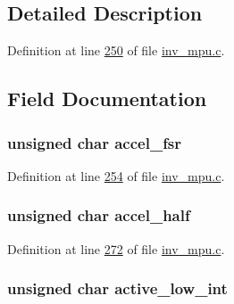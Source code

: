 \subsection{Detailed Description}


Definition at line \hyperlink{inv__mpu_8c_source_l00250}{250} of file \hyperlink{inv__mpu_8c_source}{inv\+\_\+mpu.\+c}.



\subsection{Field Documentation}
\subsubsection[{\texorpdfstring{accel\+\_\+fsr}{accel_fsr}}]{\setlength{\rightskip}{0pt plus 5cm}unsigned char accel\+\_\+fsr}\hypertarget{structchip__cfg__s_a97d5de8aa2fab5cc81ca2180130fc6ac}{}\label{structchip__cfg__s_a97d5de8aa2fab5cc81ca2180130fc6ac}


Definition at line \hyperlink{inv__mpu_8c_source_l00254}{254} of file \hyperlink{inv__mpu_8c_source}{inv\+\_\+mpu.\+c}.

\subsubsection[{\texorpdfstring{accel\+\_\+half}{accel_half}}]{\setlength{\rightskip}{0pt plus 5cm}unsigned char accel\+\_\+half}\hypertarget{structchip__cfg__s_af73df77287fdeba8d408c18f3905650f}{}\label{structchip__cfg__s_af73df77287fdeba8d408c18f3905650f}


Definition at line \hyperlink{inv__mpu_8c_source_l00272}{272} of file \hyperlink{inv__mpu_8c_source}{inv\+\_\+mpu.\+c}.

\subsubsection[{\texorpdfstring{active\+\_\+low\+\_\+int}{active_low_int}}]{\setlength{\rightskip}{0pt plus 5cm}unsigned char active\+\_\+low\+\_\+int}\hypertarget{structchip__cfg__s_ac576d810c0c8bcd73af5908c10a83c3a}{}\label{structchip__cfg__s_ac576d810c0c8bcd73af5908c10a83c3a}


